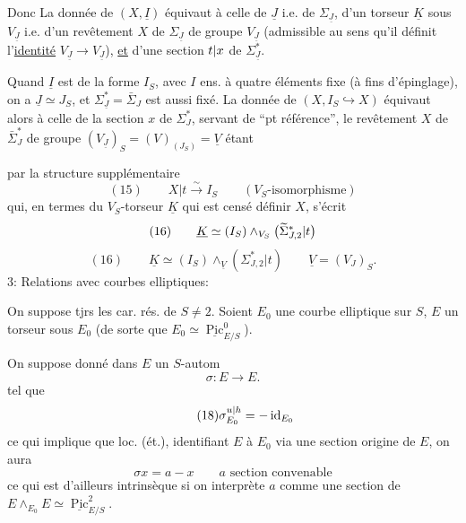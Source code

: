 Donc La donnée de $(X,\underline I)$ équivaut à celle de \deleted{\unsure{$\Sigma$}} $\underline J$ i.e. de $\Sigma_{\underline J}$, d'un torseur $\underline K$ sous $V_{\underline J}$ i.e. d'un revêtement $X$ de $\Sigma_{\underline J}$  de groupe $V_{\underline J}$ (admissible au sens qu'il définit l'\uline{identité} $V_{\underline J}\longrightarrow V_{\underline J}$), \uline{et} d'une section $t|x$ de $\Sigma^*_{\underline J}$.

Quand $\underline I$ est  de la forme $I_S$, avec $I$ ens. à quatre éléments fixe (à fins d'épinglage), on a $\underline J\simeq J_S$, et $\Sigma^*_{\underline J}=\bar\Sigma_J$ est aussi fixé. La donnée de $(X,I_S\hookrightarrow X)$ équivaut alors à celle de la section $x$ de $\Sigma^*_J$, servant de ``pt référence'', le revêtement $X$ de $\bar\Sigma^*_J$ de groupe $(V_{\underline J})_S=(V)_{(J_S)}=\underline V$ étant

 par la  structure supplémentaire
\[
(15)\qquad X|t\xrightarrow{\sim}I_S\qquad(V_S\text{-isomorphisme})
\]
qui, en termes du $V_S$-torseur $\underline K$ qui est censé définir $X$, s'écrit
\[
(16)\qquad\underline K\simeq(I_S)\wedge_{V_S}\bigl(\widetilde\Sigma_{J,2}^*|t\bigr)
\]
\[
(16)\qquad\underline K\simeq(I_S)\wedge_{\underline V}(\Sigma_{J,2}^*|t)
\qquad\underline V=(V_J)_S.
\]
3: Relations avec courbes elliptiques:

On suppose tjrs les car. rés. de $S\ne2$. Soient $E_0$ une courbe elliptique sur $S$, $E$ un torseur sous $E_0$ (de sorte que $E_0\simeq\underline{\operatorname{Pic}}^0_{E/S}$).

On suppose donné dans $E$ un $S$-autom
\[
\tag{17}\sigma:E\longrightarrow E.
\]
tel que
\[
\tag{18}\sigma_{E_0}^{u|h}=-\operatorname{id}_{E_0}
\]
ce qui implique que loc. (ét.), identifiant $E$ à $E_0$ via une section origine de $E$, on aura
\[
\sigma x=a-x\qquad a\text{ section convenable}
\]
ce qui est d'ailleurs intrinsèque si on interprète $a$ comme une section de $E\wedge_{E_0}E\simeq\underline{\operatorname{Pic}}^2_{E/S}$.

